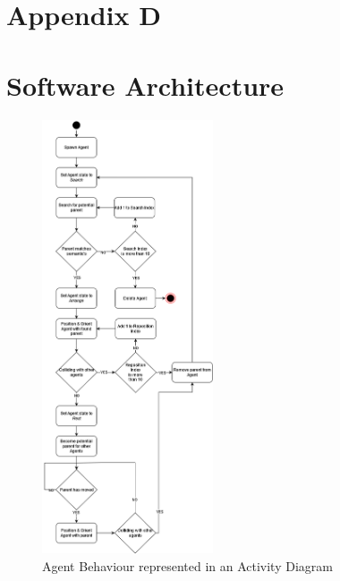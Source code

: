 \newpage
\section*{Appendix D}
\section*{Software Architecture}
\label{append:d}
\begin{figure}[ht]
    \label{activity-diagram}
    \includegraphics[width=0.45\textwidth]{./Images/AgentActivityDiagram.png}
    \centering
    \caption{Agent Behaviour represented in an Activity Diagram}
\end{figure}
